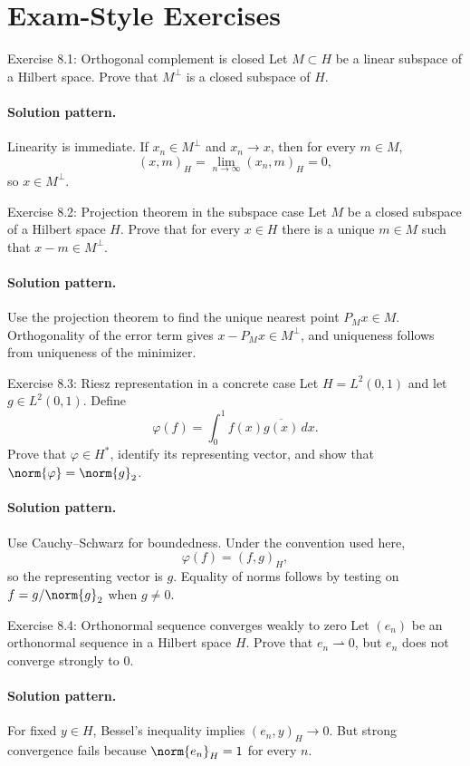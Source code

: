 \documentclass[header={Lecture 8 Exam Study Notes}]{study-note}
\begin{document}
\section{Exam-Style Exercises}

\begin{exbox}{Exercise 8.1: Orthogonal complement is closed}
Let $M\subset H$ be a linear subspace of a Hilbert space. Prove that $M^{\perp}$ is a closed subspace of $H$.

\paragraph{Solution pattern.}
Linearity is immediate. If $x_n\in M^{\perp}$ and $x_n\to x$, then for every $m\in M$,
\[
(x,m)_H=\lim_{n\to\infty}(x_n,m)_H=0,
\]
so $x\in M^{\perp}$.
\end{exbox}

\begin{exbox}{Exercise 8.2: Projection theorem in the subspace case}
Let $M$ be a closed subspace of a Hilbert space $H$. Prove that for every $x\in H$ there is a unique $m\in M$ such that $x-m\in M^{\perp}$.

\paragraph{Solution pattern.}
Use the projection theorem to find the unique nearest point $P_Mx\in M$. Orthogonality of the error term gives $x-P_Mx\in M^{\perp}$, and uniqueness follows from uniqueness of the minimizer.
\end{exbox}

\begin{exbox}{Exercise 8.3: Riesz representation in a concrete case}
Let $H=L^2(0,1)$ and let $g\in L^2(0,1)$. Define
\[
\varphi(f)=\int_0^1 f(x)\overline{g(x)}\,dx.
\]
Prove that $\varphi\in H^*$, identify its representing vector, and show that $\norm{\varphi}=\norm{g}_2$.

\paragraph{Solution pattern.}
Use Cauchy--Schwarz for boundedness. Under the convention used here,
\[
\varphi(f)=(f,g)_H,
\]
so the representing vector is $g$. Equality of norms follows by testing on $f=g/\norm{g}_2$ when $g\neq 0$.
\end{exbox}

\begin{exbox}{Exercise 8.4: Orthonormal sequence converges weakly to zero}
Let $(e_n)$ be an orthonormal sequence in a Hilbert space $H$. Prove that $e_n\rightharpoonup 0$, but $e_n$ does not converge strongly to $0$.

\paragraph{Solution pattern.}
For fixed $y\in H$, Bessel's inequality implies $(e_n,y)_H\to 0$. But strong convergence fails because $\norm{e_n}_H=1$ for every $n$.
\end{exbox}
\end{document}
